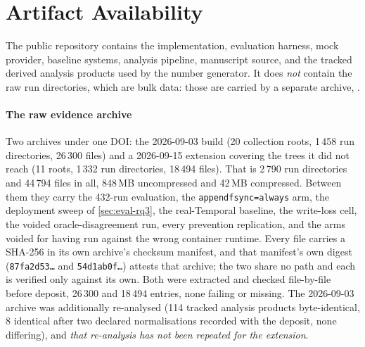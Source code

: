 \section{Artifact Availability}
\label{sec:artifact}

The public repository \artifactavail{} contains the implementation, evaluation
harness, mock provider, baseline systems, analysis pipeline, manuscript source,
and the tracked derived analysis products used by the number generator. It does
\emph{not} contain the raw run directories, which are bulk data: those are
carried by a separate archive, \archiveavail{}.

\paragraph{The raw evidence archive} Two archives under one DOI: the
2026-09-03 build (20 collection roots, 1\,458 run directories, 26\,300
files) and a 2026-09-15 extension covering the trees it did not reach (11
roots, 1\,332 run directories, 18\,494 files). That is 2\,790 run directories
and 44\,794 files in all, 848\,MB uncompressed and 42\,MB compressed. Between
them they carry the 432-run evaluation, the \texttt{appendfsync=always} arm,
the deployment sweep of \cref{sec:eval-rq3}, the real-Temporal baseline, the
write-loss cell, the voided oracle-disagreement run, every prevention
replication, and the arms voided for having run against the wrong container
runtime. Every file carries a SHA-256 in its own archive's
checksum manifest, and that manifest's own digest
(\texttt{87fa2d53\ldots} and \texttt{54d1ab0f\ldots}) attests that archive;
the two share no path and each is verified only against its own. Both were
extracted and checked file-by-file before deposit, 26\,300 and 18\,494
entries, none failing or missing. The 2026-09-03 archive was additionally
re-analysed (114 tracked analysis products byte-identical, 8 identical
after two declared normalisations recorded with the deposit, none differing),
and \emph{that re-analysis has not been repeated for the extension}.
